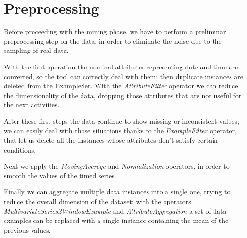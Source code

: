 \section{Preprocessing}

Before proceeding with the mining phase, we have to perform a preliminar preprocessing step on the data, in order to eliminate the noise due to the sampling of real data.
   
With the first operation the nominal attributes representing date and time are converted, so the tool can correctly deal with them; then duplicate instances are deleted from the ExampleSet. With the \textit{AttributeFilter} operator we can reduce the dimensionality of the data, dropping those attributes that are not useful for the next activities.

After these first steps the data continue to show missing or inconsistent values; we can easily deal with those situations thanks to the \textit{ExampleFilter} operator, that let us delete all the instances whose attributes don't satisfy certain conditions.     

Next we apply the \textit{MovingAverage} and \textit{Normalization} operators, in order to smooth the values of the timed series.

Finally we can aggregate multiple data instances into a single one, trying to reduce the overall dimension of the dataset; with the operators \textit{MultivariateSeries2WindowExample} and \textit{AttributeAggregation} a set of data examples can be replaced with a single instance containing the mean of the previous values. 
